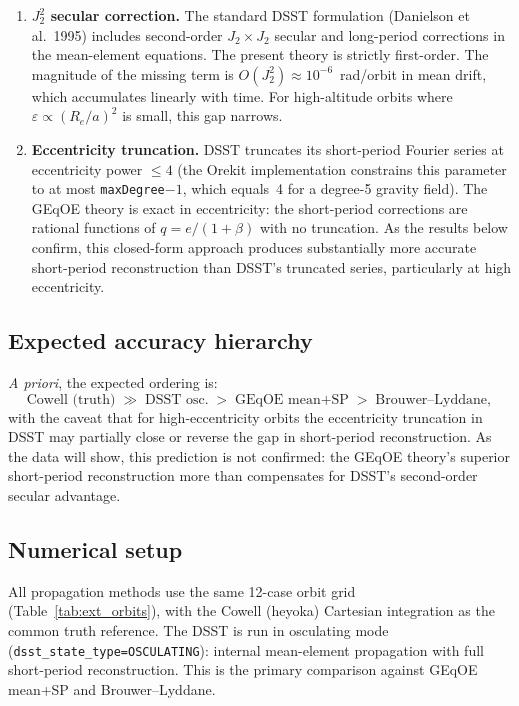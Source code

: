 \documentclass[11pt]{article}
\begin{document}
\begin{enumerate}
\item \textbf{$J_2^2$ secular correction.} The standard DSST formulation
(Danielson et al.\ 1995) includes second-order $J_2 \times J_2$ secular and
long-period corrections in the mean-element equations. The present theory is
strictly first-order. The magnitude of the missing term is
$O(J_2^2) \approx 10^{-6}$~rad/orbit in mean drift, which accumulates
linearly with time. For high-altitude orbits where
$\varepsilon \propto (R_e/a)^2$ is small, this gap narrows.

\item \textbf{Eccentricity truncation.} DSST truncates its short-period
Fourier series at eccentricity power $\leq 4$ (the Orekit implementation
constrains this parameter to at most \texttt{maxDegree}$-1$, which
equals~4 for a degree-5 gravity field). The GEqOE theory is exact in
eccentricity: the short-period corrections are rational functions of
$q = e/(1+\beta)$ with no truncation. As the results below confirm,
this closed-form approach produces substantially more accurate
short-period reconstruction than DSST's truncated series, particularly
at high eccentricity.
\end{enumerate}

\subsection{Expected accuracy hierarchy}

\emph{A priori}, the expected ordering is:
\[
\text{Cowell (truth)} \;\gg\; \text{DSST osc.}
\;>\; \text{GEqOE mean+SP} \;>\; \text{Brouwer--Lyddane},
\]
with the caveat that for high-eccentricity orbits the eccentricity truncation
in DSST may partially close or reverse the gap in short-period
reconstruction. As the data will show, this prediction is not confirmed:
the GEqOE theory's superior short-period reconstruction more than
compensates for DSST's second-order secular advantage.

\subsection{Numerical setup}

All propagation methods use the same 12-case orbit grid
(Table~\ref{tab:ext_orbits}), with the Cowell (heyoka) Cartesian
integration as the common truth reference. The DSST is run in
osculating mode (\texttt{dsst\_state\_type=OSCULATING}): internal
mean-element propagation with full short-period reconstruction.
This is the primary comparison against GEqOE mean+SP and
Brouwer--Lyddane.
\end{document}
